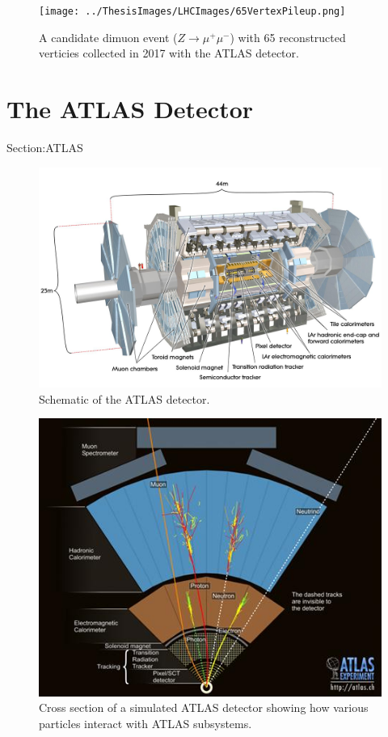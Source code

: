 \begin{figure}[h!]
	\centering
	\texttt{[image: ../ThesisImages/LHCImages/65VertexPileup.png]}
	\caption{ A candidate dimuon event ($Z\rightarrow \mu^+ \mu^-$) with 65 reconstructed verticies collected in 2017 with the ATLAS detector.
	}
	\label{fig:HighPileup2}
\end{figure}

\section{The ATLAS Detector}
Section:ATLAS
\begin{figure}[h!]
	\centering
	\includegraphics[width=\columnwidth]{../ThesisImages/LHCImages/AtlasDetector.png}
	\caption[Schematic of the ATLAS detector.]{Schematic of the ATLAS detector.\cite{ATLAS}
	}
	\label{fig:ATLASOverview}
\end{figure}

\begin{figure}[h!]
	\centering
	\includegraphics[width=\columnwidth]{../ThesisImages/LHCImages/ParticleInteractions.jpg}
	\caption[Cross section of a simulated ATLAS detector showing how various particles interact with ATLAS subsystems.]{Cross section of a simulated ATLAS detector showing how various particles interact with ATLAS subsystems.\cite{ParticleInteractions}
	}
	\label{fig:ATLASInteractions}
\end{figure}




